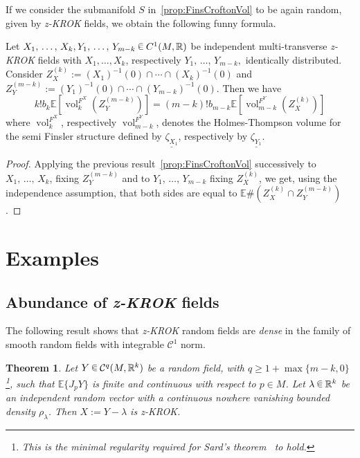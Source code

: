 \documentclass[10pt]{amsart}
\newtheorem{theo}{Theorem}[section]
\theoremstyle{definition}\newtheorem{defi}[theo]{Definition}\newtheorem{rema}[theo]{Remark}\newtheorem{exam}[theo]{Example}\newtheorem{exem}[theo]{Example}\newtheorem{nota}[theo]{Notation}
\newcommand{\R}{\mathbb{R}}
\newcommand{\EE}{\mathbb{E}}
\DeclareMathOperator{\vol}{vol}
\newcommand{\mC}{\mathcal{C}}
\newcommand{\seg}{\underline}
\newcommand{\zkrok}{\emph{z-KROK}\xspace}
\newcommand{\uball}{b}
\newcommand*\randin{
\mathchoice {\raisebox{-.35ex}{$\displaystyle{^\subset}$}\mkern-11.5mu\raisebox{+.45ex}{$\displaystyle{_\subset}$}} {\mkern+1mu\raisebox{-.27ex}{$\textstyle{^\subset}$}\mkern-11.7mu\raisebox{+.45ex}{$\textstyle{_\subset}$}} {\raisebox{.35ex}{$\scriptstyle\subset$}\mkern-14mu\raisebox{-.15ex}{$\scriptstyle\subset$}} {\raisebox{.3ex}{$\scriptscriptstyle\subset$}\mkern-13.5mu\raisebox{-.10ex}{$\scriptscriptstyle\subset$}}}
\begin{document}
If we consider the submanifold $S$ in~\cref{prop:FinsCroftonVol} to be again random, given by \zkrok fields, we obtain the following funny formula.

\begin{coro}\label{cor:funny}
Let $X_1,\,\ldots,\,X_k,Y_1,\,\ldots,\,Y_{m-k}\,\randin\, C^1(M,\R)$ be independent multi-transverse \zkrok fields with $X_1,\ldots,X_k$, respectively $Y_1,\,\ldots,\,Y_{m-k},$ identically distributed. Consider $Z_X^{(k)}:=(X_1)^{-1}(0)\cap\cdots\cap (X_k)^{-1}(0)$ and $Z_Y^{(m-k)}:=(Y_1)^{-1}(0)\cap\cdots\cap (Y_{m-k})^{-1}(0)$. Then we have
\begin{equation*}
k!\uball_k\EE\left[\vol_k^{F^X}\left(Z_Y^{(m-k)}\right)\right]=(m-k)!\uball_{m-k}\EE\left[\vol_{m-k}^{F^Y}\left(Z_X^{(k)}\right)\right]
\end{equation*}
where $\vol_k^{F^X}$, respectively $\vol_{m-k}^{F^Y}$, denotes the Holmes-Thompson volume for the semi Finsler structure defined by $\seg{\zeta_{X_1}}$, respectively by $\seg{\zeta_{Y_1}}$.
\end{coro}

\begin{proof}
Applying the previous result~\cref{prop:FinsCroftonVol} successively to $X_1,\,\ldots,\,X_k$, fixing $Z_Y^{(m-k)}$ and to $Y_1,\,\ldots,\,Y_{m-k}$ fixing $Z_X^{(k)}$, we get, using the independence assumption, that both sides are equal to $\EE\#(Z_X^{(k)}\cap Z_Y^{(m-k)})$.
\end{proof}


\section{Examples}\label{sec:ex}
\subsection{Abundance of {\zkrok} fields}\label{sub:abu}

The following result shows that \zkrok random fields are \emph{dense} in the family of smooth random fields with integrable $\mC^1$ norm.


\begin{theo}\label{thm:abundance}
Let $Y\,\randin\, \mC^q(M,\R^k)$ be a random field, with $q\ge 1+\max\{m-k,0\}$\footnote{This is the minimal regularity required for Sard's theorem~\cite{sard} to hold.}, such that $\EE\{J_pY\}$ is finite and continuous with respect to $p\in M$. Let $\lambda\,\randin\, \R^k$ be an independent random vector with a continuous nowhere vanishing bounded density $\rho_\lambda$. Then $X:=Y-\lambda$ is \zkrok.
\end{theo}
\end{document}
